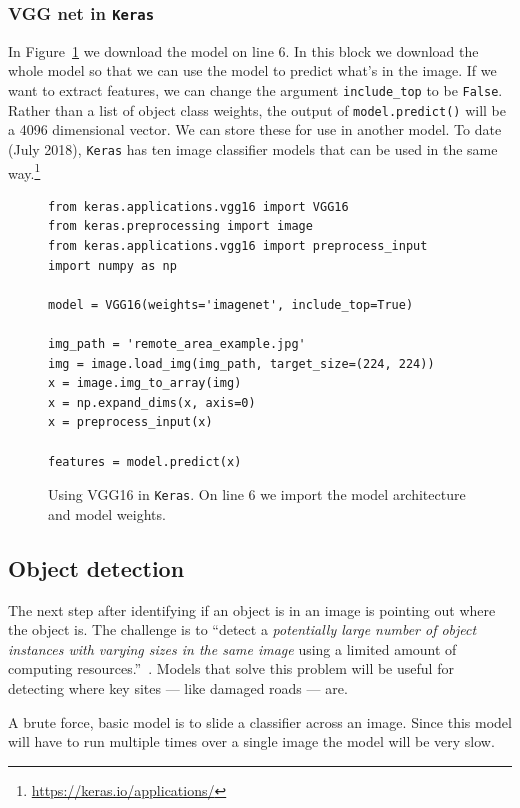 \documentclass[12pt, a4paper, oneside, headinclude, footinclude]{article}
\begin{document}
\subsubsection{VGG net in \texttt{Keras}}

In Figure~\ref{alg:vgg} we download the model on line 6. In this block we
download the whole model so that we can use the model to predict what's in the
image. If we want to extract features, we can change the argument
\texttt{include\_top} to be \texttt{False}. Rather than a list of object class
weights, the output of \texttt{model.predict()} will be a 4096 dimensional
vector. We can store these for use in another model.  To date (July 2018),
\texttt{Keras} has ten image classifier models that can be used in the same
way.\footnote{\url{https://keras.io/applications/}}

\begin{figure}
\begin{verbatim}
from keras.applications.vgg16 import VGG16
from keras.preprocessing import image
from keras.applications.vgg16 import preprocess_input
import numpy as np

model = VGG16(weights='imagenet', include_top=True)

img_path = 'remote_area_example.jpg'
img = image.load_img(img_path, target_size=(224, 224))
x = image.img_to_array(img)
x = np.expand_dims(x, axis=0)
x = preprocess_input(x)

features = model.predict(x)
\end{verbatim}
    \caption[Using VGG16 in \texttt{Keras}]{Using VGG16 in \texttt{Keras}. On
    line 6 we import the model architecture and model weights.\label{alg:vgg}}
\end{figure}

\subsection{Object detection}

The next step after identifying if an object is in an image is pointing out
where the object is. The challenge is to ``detect a \textit{potentially large
number of object instances with varying sizes in the same image} using a
limited amount of computing resources.''~\cite[their emphasis]{NIPS2013_5207}.
Models that solve this problem will be useful for detecting where key sites
--- like damaged roads --- are.

A brute force, basic model is to slide a classifier across an image. Since
this model will have to run multiple times over a single image the model will
be very slow. 
\end{document}
